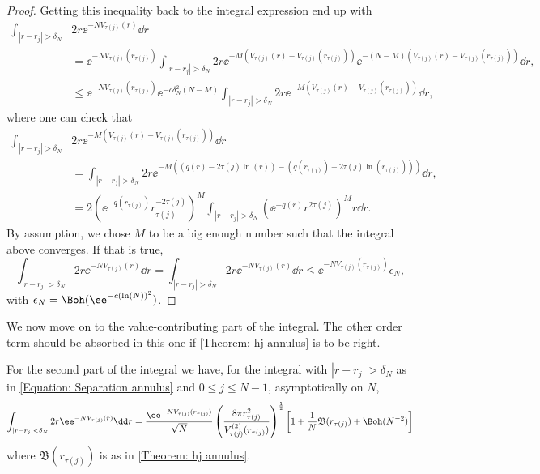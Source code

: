 \begin{proof}
	Getting this inequality back to the integral expression end up with
	\begin{align}
		\int_{|r - r_j| > \delta_N} & 2r \ee^{-N V_{\tau(j)}(r)} \dd r \\
		& =  \ee^{-N V_{\tau(j)}(r_{\tau(j)})} \int_{|r - r_j| > \delta_N} 2r \ee^{-M \left( V_{\tau(j)}(r) - V_{\tau(j)}(r_{\tau(j)}) \right)}  \ee^{-(N-M) \left( V_{\tau(j)}(r) - V_{\tau(j)}(r_{\tau(j)}) \right)} \dd r, \\
		& \leq \ee^{-N V_{\tau(j)}(r_{\tau(j)})}  \ee^{- c \delta_N^2 (N - M)} \int_{|r - r_j| > \delta_N} 2r \ee^{-M \left( V_{\tau(j)}(r) - V_{\tau(j)}(r_{\tau(j)}) \right)} \dd r,
	\end{align}
	where one can check that
	\begin{align}
		\int_{|r - r_j| > \delta_N}  & 2r \ee^{-M \left( V_{\tau(j)}(r) - V_{\tau(j)}(r_{\tau(j)}) \right)} \dd r \\ 
		& = \int_{|r - r_j| > \delta_N} 2r \ee^{-M \left( (q(r) - 2 \tau(j) \ln(r)) - (q(r_{\tau(j)}) - 2 \tau(j) \ln(r_{\tau(j)})) \right)} \dd r,  \\
		& = 2 \left( \ee^{-q(r_{\tau(j)})} r_{\tau(j)}^{-2 \tau(j)} \right)^M \int_{|r - r_j| > \delta_N} \left( \ee^{-q(r)} r^{2 \tau(j)} \right)^M r \dd r.
	\end{align}
	By assumption, we chose $M$ to be a big enough number such that the integral above converges. If that is true, 
	\begin{equation}
		\int_{|r - r_j| > \delta_N} 2r \ee^{-N V_{\tau(j)}(r)} \dd r = \int_{|r - r_j| > \delta_N} 2r \ee^{-N V_{\tau(j)}(r)} \dd r \leq \ee^{-N V_{\tau(j)}(r_{\tau(j)})} \epsilon_N,
	\end{equation}
	with $\epsilon_N = \Boh(\ee^{-c(\ln(N))^2})$.  
\end{proof}
	
We now move on to the value-contributing part of the integral. The other order term should be absorbed in this one if \autoref{Theorem: hj annulus} is to be right.
	
\begin{lema} 	\label{Lema: value annulus}
		For the second part of the integral we have, for the integral  with $|r - r_j| > \delta_N$ as in \eqref{Equation: Separation annulus} and $0 \leq j \leq N-1$, asymptotically on $N$,
		\begin{equation}
			\int_{|r - r_j| < \delta_N} 2r \ee^{-N V_{\tau(j)}(r)} \dd r  = \frac{\ee^{-N V_{\tau(j)}(r_{\tau(j)})}}{\sqrt{N}} \left( \frac{8\pi r_{\tau(j)}^2}{V^{(2)}_{\tau(j)}(r_{\tau(j)})} \right)^{\frac{1}{2}} \left[ 1 + \frac{1}{N} \mathfrak{B}(r_{\tau(j)}) + \Boh(N^{-2}) \right]
			\label{Equation: main part annulus}
		\end{equation}
		where $\mathfrak{B}(r_{\tau(j)})$ is as in \autoref{Theorem: hj annulus}.
\end{lema}	

